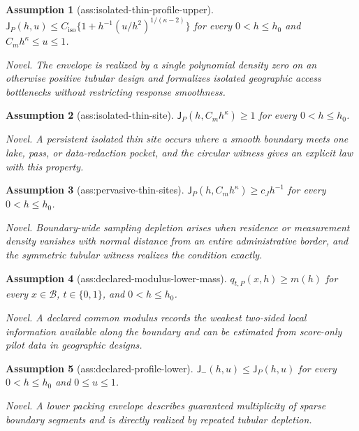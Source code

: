 \documentclass{article}
\newtheorem{assumption}{Assumption}
\begin{document}
\begin{assumption}[ass:isolated-thin-profile-upper]\label{ass:isolated-thin-profile-upper}
\(\mathsf J_P(h,u)\le C_{\mathrm{iso}}\{1+h^{-1}(u/h^2)^{1/(\kappa-2)}\}\) for every \(0<h\le h_0\) and \(C_mh^{\kappa}\le u\le1\).
\par\smallskip\noindent\emph{Novel.} The envelope is realized by a single polynomial density zero on an otherwise positive tubular design and formalizes isolated geographic access bottlenecks without restricting response smoothness.
\end{assumption}

\begin{assumption}[ass:isolated-thin-site]\label{ass:isolated-thin-site}
\(\mathsf J_P(h,C_mh^{\kappa})\ge1\) for every \(0<h\le h_0\).
\par\smallskip\noindent\emph{Novel.} A persistent isolated thin site occurs where a smooth boundary meets one lake, pass, or data-redaction pocket, and the circular witness gives an explicit law with this property.
\end{assumption}

\begin{assumption}[ass:pervasive-thin-sites]\label{ass:pervasive-thin-sites}
\(\mathsf J_P(h,C_mh^{\kappa})\ge c_Jh^{-1}\) for every \(0<h\le h_0\).
\par\smallskip\noindent\emph{Novel.} Boundary-wide sampling depletion arises when residence or measurement density vanishes with normal distance from an entire administrative border, and the symmetric tubular witness realizes the condition exactly.
\end{assumption}

\begin{assumption}[ass:declared-modulus-lower-mass]\label{ass:declared-modulus-lower-mass}
\(q_{t,P}(x,h)\ge m(h)\) for every \(x\in\mathcal B\), \(t\in\{0,1\}\), and \(0<h\le h_0\).
\par\smallskip\noindent\emph{Novel.} A declared common modulus records the weakest two-sided local information available along the boundary and can be estimated from score-only pilot data in geographic designs.
\end{assumption}

\begin{assumption}[ass:declared-profile-lower]\label{ass:declared-profile-lower}
\(\mathsf J_{-}(h,u)\le\mathsf J_P(h,u)\) for every \(0<h\le h_0\) and \(0\le u\le1\).
\par\smallskip\noindent\emph{Novel.} A lower packing envelope describes guaranteed multiplicity of sparse boundary segments and is directly realized by repeated tubular depletion.
\end{assumption}
\end{document}
